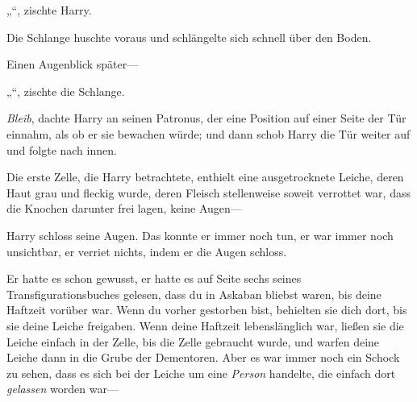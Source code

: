 „“, zischte Harry.

Die Schlange huschte voraus und schlängelte sich schnell über den Boden.

Einen Augenblick später—

„“, zischte die Schlange.

\emph{Bleib}, dachte Harry an seinen Patronus, der eine Position auf einer Seite der Tür einnahm, als ob er sie bewachen würde; und dann schob Harry die Tür weiter auf und folgte nach innen.

Die erste Zelle, die Harry betrachtete, enthielt eine ausgetrocknete Leiche, deren Haut grau und fleckig wurde, deren Fleisch stellenweise soweit verrottet war, dass die Knochen darunter frei lagen, keine Augen—

Harry schloss seine Augen. Das konnte er immer noch tun, er war immer noch unsichtbar, er verriet nichts, indem er die Augen schloss.

Er hatte es schon gewusst, er hatte es auf Seite sechs seines Transfigurationsbuches gelesen, dass du in Askaban bliebst waren, bis deine Haftzeit vorüber war. Wenn du vorher gestorben bist, behielten sie dich dort, bis sie deine Leiche freigaben. Wenn deine Haftzeit lebenslänglich war, ließen sie die Leiche einfach in der Zelle, bis die Zelle gebraucht wurde, und warfen deine Leiche dann in die Grube der Dementoren. Aber es war immer noch ein Schock zu sehen, dass es sich bei der Leiche um eine \emph{Person} handelte, die einfach dort \emph{gelassen} worden war—

